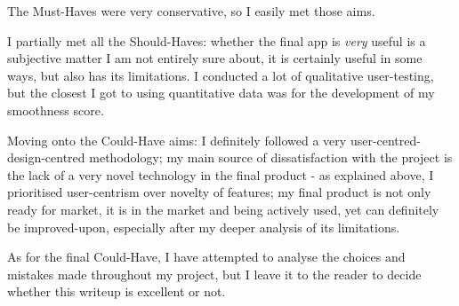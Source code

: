 The Must-Haves were very conservative, so I easily met those aims.

I partially met all the Should-Haves: whether the final app is \textit{very} useful is a subjective matter I am not entirely sure about, it is certainly useful in some ways, but also has its limitations.
I conducted a lot of qualitative user-testing, but the closest I got to using quantitative data was for the development of my smoothness score.

Moving onto the Could-Have aims: I definitely followed a very user-centred-design-centred methodology; my main source of dissatisfaction with the project is the lack of a very novel technology in the final product - as explained above, I prioritised user-centrism over novelty of features; my final product is not only ready for market, it is in the market and being actively used, yet can definitely be improved-upon, especially after my deeper analysis of its limitations.

As for the final Could-Have, I have attempted to analyse the choices and mistakes made throughout my project, but I leave it to the reader to decide whether this writeup is excellent or not.







